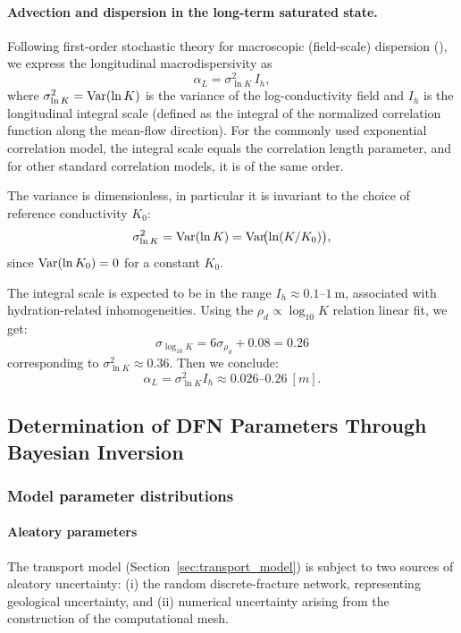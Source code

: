 \paragraph{Advection and dispersion in the long-term saturated state.}
Following first-order stochastic theory for macroscopic (field-scale)
dispersion (\cite{Zech_Evidence_2023}), we express the longitudinal
macrodispersivity as
\begin{equation}
    \label{eq:dispersivity}
    \alpha_L = \sigma_{\ln K}^2\, I_h,
\end{equation}
where $\sigma_{\ln K}^2=\mathop{\rm Var}(\ln K)$ is the variance of the log-conductivity
field and $I_h$ is the longitudinal integral scale (defined as the integral of
the normalized correlation function along the mean-flow direction). For the
commonly used exponential correlation model, the integral scale equals the
correlation length parameter, and for other standard correlation models, it is
of the same order.

The variance is dimensionless, in particular it is invariant to
the choice of reference conductivity $K_0$:
\[
 \sigma_{\ln K}^2=\mathop{\rm Var}(\ln K)=\mathop{\rm Var}\!\bigl(\ln(K/K_0)\bigr),
\]
since $\mathop{\rm Var}(\ln K_0)=0$ for a constant $K_0$.

The integral scale is expected to be in the range
$I_h \approx 0.1$--$1~\mathrm{m}$, associated with hydration-related
inhomogeneities. Using the $\rho_d  \propto \log_{10} K$ relation linear fit,
we get:
\[
\sigma_{\log_{10}K} = 6 \sigma_{\rho_d} + 0.08 = 0.26
\]
corresponding to  $\sigma^2_{\ln K}\approx 0.36$.
Then we conclude:
\[
\alpha_L = \sigma_{\ln K}^2 I_h \approx 0.026\text{--}0.26~[m].
\]

\subsection{Determination of \gls{DFN} Parameters Through Bayesian Inversion}
\label{sec:dfn_bayesian_inversion}

\subsubsection{Model parameter distributions}

\paragraph{Aleatory parameters}
The transport model (Section~\ref{sec:transport_model}) is subject to two
sources of aleatory uncertainty:
(i) the random discrete-fracture network, representing geological uncertainty,
and
(ii) numerical uncertainty arising from the construction of the computational
mesh.


